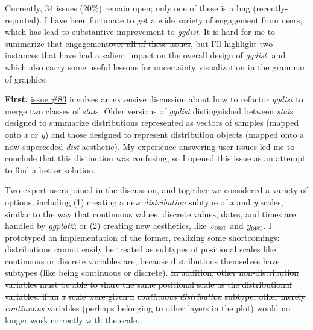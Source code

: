 \documentclass[journal]{vgtc}                     %
\providecommand{\DIFdel}[1]{{\protect\color{red}\sout{#1}}}                      %
\providecommand{\DIFdelbegin}{} %
\providecommand{\DIFdelend}{} %
\begin{document}
Currently, 34 issues (20\%) remain open; only one of these is a bug (recently-reported). 
I have been fortunate to get a wide variety of engagement from users, which has lead to substantive improvement to \textit{ggdist}. It is hard for me to summarize that engagement\DIFdelbegin \DIFdel{over all of these issues}\DIFdelend , but I'll highlight two instances that \DIFdelbegin \DIFdel{have }\DIFdelend had a salient impact on the overall design of \textit{ggdist}, and which also carry some useful lessons for uncertainty visualization in the grammar of graphics.

\textbf{First,} \href{https://github.com/mjskay/ggdist/issues/83}{issue \#83} involves an extensive discussion about how to refactor \textit{ggdist} to merge two classes of \textit{stat}s. Older versions of \textit{ggdist} distinguished between \textit{stat}s designed to summarize distributions represented as vectors of samples (mapped onto \textit{x} or \textit{y}) and those designed to represent distribution objects (mapped onto a now-superceded \textit{dist} aesthetic). My experience answering user issues led me to conclude that this distinction was confusing, so I opened this issue as an attempt to find a better solution. 

Two expert users joined in the discussion, and together we considered a variety of options, including (1) creating a new \textit{distribution} subtype of \textit{x} and \textit{y} scales, similar to the way that continuous values, discrete values, dates, and times are handled by \textit{ggplot2}; or (2) creating new aesthetics, like $x_\textsc{dist}$ and $y_\textsc{dist}$. I prototyped an implementation of the former, realizing some shortcomings: distributions cannot easily be treated as subtypes of positional scales like continuous or discrete variables are, because distributions themselves have subtypes (like being continuous or discrete). 
\DIFdelbegin \DIFdel{In addition, other non-distribution variables must be able to share the same positional scale as the distributional variables: if an }\textit{\DIFdel{x}} %
\DIFdel{scale were given a }\textit{\DIFdel{continuous distribution}} %
\DIFdel{subtype, other merely }\textit{\DIFdel{continuous}} %
\DIFdel{variables (perhaps belonging to other layers in the plot) would no longer work correctly with the scale.
}%
\end{document}
